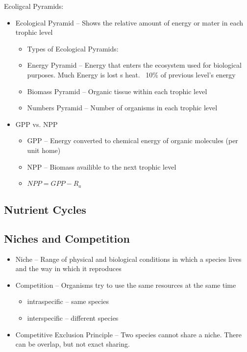 \documentclass{article}
\begin{document}
Ecoligcal Pyramids:
\begin{itemize}
\item Ecological Pyramid -- Shows the relative amount of energy or mater in each trophic level
\begin{itemize}
\item Types of Ecological Pyramids:
\item Energy Pyramid -- Energy that enters the ecosystem used for biological purposes. Much Energy is lost s heat. ~10\% of previous level's energy
\item Biomass Pyramid -- Organic tissue within each trophic level
\item Numbers Pyramid -- Number of organisms in each trophic level
\end{itemize}
\item GPP vs. NPP
\begin{itemize}
\item GPP -- Energy converted to chemical energy of organic molecules (per unit home)%
\item NPP -- Biomass availible to the next trophic level
\item $NPP=GPP-R_a$
\end{itemize}
\end{itemize}

\subsection{Nutrient Cycles}

\subsection{Niches and Competition}
\begin{itemize}
\item Niche -- Range of physical and biological conditions in which a species lives and the way in which it reproduces
\item Competition -- Organisms try to use the same resources at the same time
\begin{itemize}
\item intraspecific -- same species
\item interspecific -- different species
\end{itemize}
\item Competitive Exclusion Principle -- Two species cannot share a niche. There can be overlap, but not exact sharing.
\end{itemize}
\end{document}
